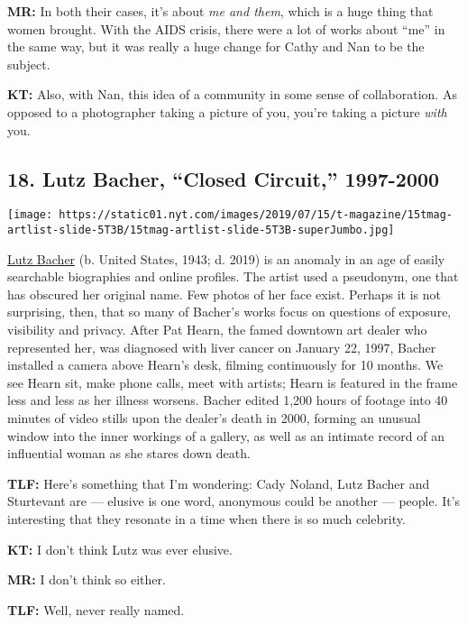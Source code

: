 \textbf{MR:} In both their cases, it's about \emph{me and them}, which
is a huge thing that women brought. With the AIDS crisis, there were a
lot of works about ``me'' in the same way, but it was really a huge
change for Cathy and Nan to be the subject.

\textbf{KT:} Also, with Nan, this idea of a community in some sense of
collaboration. As opposed to a photographer taking a picture of you,
you're taking a picture \emph{with} you.

\hypertarget{18-lutz-bacher-closed-circuit-1997-2000}{%
\subsection{18. Lutz Bacher, ``Closed Circuit,''
1997-2000}\label{18-lutz-bacher-closed-circuit-1997-2000}}

\texttt{[image: https://static01.nyt.com/images/2019/07/15/t-magazine/15tmag-artlist-slide-5T3B/15tmag-artlist-slide-5T3B-superJumbo.jpg]}

\href{https://www.nytimes.com/2019/05/26/obituaries/lutz-bacher-dies-at-75.html}{Lutz
Bacher} (b. United States, 1943; d. 2019) is an anomaly in an age of
easily searchable biographies and online profiles. The artist used a
pseudonym, one that has obscured her original name. Few photos of her
face exist. Perhaps it is not surprising, then, that so many of Bacher's
works focus on questions of exposure, visibility and privacy. After Pat
Hearn, the famed downtown art dealer who represented her, was diagnosed
with liver cancer on January 22, 1997, Bacher installed a camera above
Hearn's desk, filming continuously for 10 months. We see Hearn sit, make
phone calls, meet with artists; Hearn is featured in the frame less and
less as her illness worsens. Bacher edited 1,200 hours of footage into
40 minutes of video stills upon the dealer's death in 2000, forming an
unusual window into the inner workings of a gallery, as well as an
intimate record of an influential woman as she stares down death.

\textbf{TLF:} Here's something that I'm wondering: Cady Noland, Lutz
Bacher and Sturtevant are --- elusive is one word, anonymous could be
another --- people. It's interesting that they resonate in a time when
there is so much celebrity.

\textbf{KT:} I don't think Lutz was ever elusive.

\textbf{MR:} I don't think so either.

\textbf{TLF:} Well, never really named.

